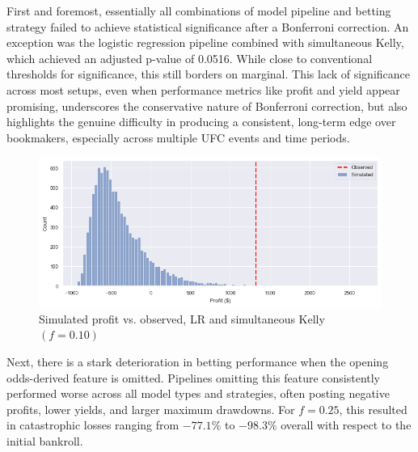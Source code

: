 \documentclass[12pt,twoside]{report}
\begin{document}
First and foremost, essentially all combinations of model pipeline and betting strategy failed to achieve statistical significance after a Bonferroni correction. An exception was the logistic regression pipeline combined with simultaneous Kelly, which achieved an adjusted p-value of 0.0516. While close to conventional thresholds for significance, this still borders on marginal. This lack of significance across most setups, even when performance metrics like profit and yield appear promising, underscores the conservative nature of Bonferroni correction, but also highlights the genuine difficulty in producing a consistent, long-term edge over bookmakers, especially across multiple UFC events and time periods.

\begin{figure}[!htb]
    \centering
    \includegraphics[width=0.8\linewidth]{figures/mc_results.png}
    \caption{Simulated profit vs. observed, LR and simultaneous Kelly $(f = 0.10)$}
\end{figure}


Next, there is a stark deterioration in betting performance when the opening odds-derived feature is omitted. Pipelines omitting this feature consistently performed worse across all model types and strategies, often posting negative profits, lower yields, and larger maximum drawdowns. For $f = 0.25$, this resulted in catastrophic losses ranging from $-77.1\%$ to $-98.3\%$ overall with respect to the initial bankroll.
\end{document}
